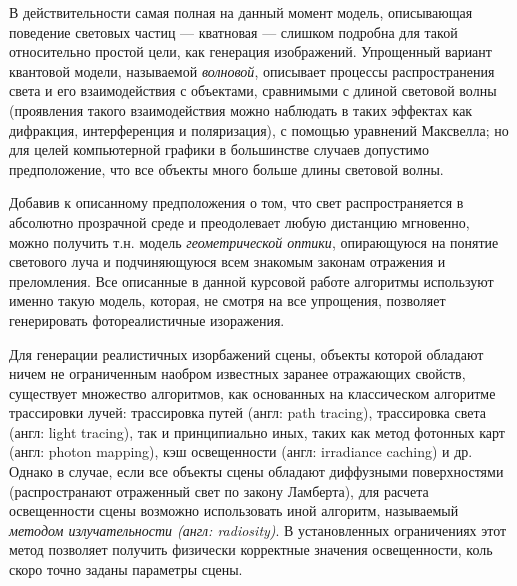 \documentclass[12pt]{article}
\begin{document}
В действительности самая полная на данный момент модель, описывающая поведение световых частиц --- кватновая --- слишком подробна для такой относительно простой цели, как генерация изображений. Упрощенный вариант квантовой модели, называемой \emph{волновой}, описывает процессы распространения света и его взаимодействия с объектами, сравнимыми с длиной световой волны (проявления такого взаимодействия можно наблюдать в таких эффектах как дифракция, интерференция и поляризация), с помощью уравнений Максвелла; но для целей компьютерной графики в большинстве случаев допустимо предположение, что все объекты много больше длины световой волны.

Добавив к описанному предположения о том, что свет распространяется в абсолютно прозрачной среде и преодолевает любую дистанцию мгновенно, можно получить т.н. модель \emph{геометрической оптики}, опирающуюся на понятие светового луча и подчиняющуюся всем знакомым законам отражения и преломления. Все описанные в данной курсовой работе алгоритмы используют именно такую модель, которая, не смотря на все упрощения, позволяет генерировать фотореалистичные изоражения.

Для генерации реалистичных изорбажений сцены, объекты которой обладают ничем не ограниченным наобром известных заранее отражающих свойств, существует множество алгоритмов, как основанных на классическом алгоритме трассировки лучей: трассировка путей (англ: path tracing), трассировка света (англ: light tracing), так и принципиально иных, таких как метод фотонных карт (англ: photon mapping), кэш освещенности (англ: irradiance caching) и др. Однако в случае, если все объекты сцены обладают диффузными поверхностями (распространают отраженный свет по закону Ламберта), для расчета освещенности сцены возможно использовать иной алгоритм, называемый \emph{методом излучательности (англ: radiosity)}. В установленных ограничениях этот метод позволяет получить физически корректные значения освещенности, коль скоро точно заданы параметры сцены. 
\end{document}
